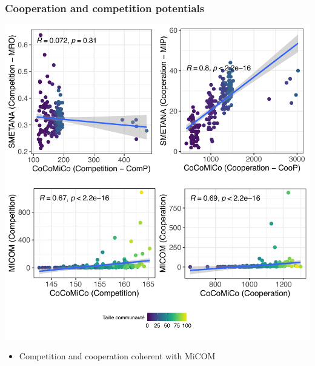\documentclass[8pt,usenames,dvipsnames]{beamer}
\begin{document}
\begin{frame}
\frametitle{Cooperation and competition potentials}
\begin{minipage}{0.7\textwidth}
\includegraphics[width=\textwidth]{figures/ccmc-micom-smetana.pdf}
\end{minipage}%
\hspace{0.1cm}
\hfill
\begin{minipage}{0.28\textwidth}
\begin{block}{}
\begin{itemize}
\item Competition and cooperation coherent with MiCOM
\end{itemize}
\end{block}
\end{minipage}
\end{frame}
\end{document}
